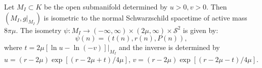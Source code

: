Let $M_I \subset K$ be the open submanifold determined by $u > 0, v > 0$. Then $(M_I, g|_{M_I})$ is isometric to the normal Schwarzschild spacetime of active mass $8\pi\mu$. The isometry $\psi: M_I \to (-\infty, \infty) \times (2\mu, \infty) \times \mathcal{S}^2$ is given by:
$$\psi(n) = (t(n), r(n), P(n)),$$
where $t = 2\mu[\ln u - \ln(-v)]|_{M_I}$ and the inverse is determined by $u = (r - 2\mu)\exp[(r - 2\mu + t)/4\mu]$, $v = (r - 2\mu)\exp[(r - 2\mu - t)/4\mu]$.
